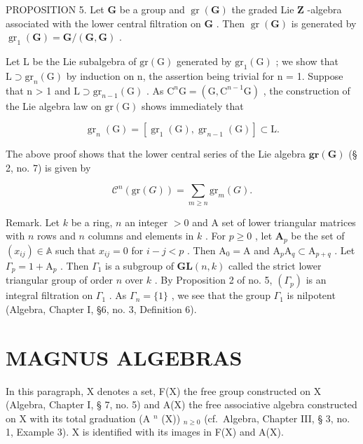 PROPOSITION 5. Let \(\mathbf{G}\) be a group and \(\operatorname{gr}(\mathbf{G})\) the graded Lie \(\mathbf{Z}\) -algebra associated with the lower central filtration on \(\mathbf{G}\) . Then \(\operatorname{gr}(\mathbf{G})\) is generated by \(\operatorname{gr}_1(\mathbf{G}) = \mathbf{G}/(\mathbf{G},\mathbf{G})\) .

Let L be the Lie subalgebra of \(\mathrm{gr}(\mathrm{G})\) generated by \(\mathrm{gr}_{1}(\mathrm{G})\) ; we show that \(\mathrm{L} \supset \mathrm{gr}_{n}(\mathrm{G})\) by induction on n, the assertion being trivial for n = 1. Suppose that n > 1 and \(\mathrm{L} \supset \mathrm{gr}_{n-1}(\mathrm{G})\) . As \(\mathrm{C}^{n}\mathrm{G} = (\mathrm{G}, \mathrm{C}^{n-1}\mathrm{G})\) , the construction of the Lie algebra law on \(\mathrm{gr}(\mathrm{G})\) shows immediately that

\[
\operatorname{gr} _ {n} (\mathrm{G}) = \left[ \operatorname{gr} _ {1} (\mathrm{G}), \operatorname{gr} _ {n - 1} (\mathrm{G}) \right] \subset \mathrm{L}.
\]

The above proof shows that the lower central series of the Lie algebra \(\mathbf{gr}(\mathbf{G})\) (§ 2, no. 7) is given by

\[
\mathcal {C} ^ {n} (\mathrm{gr} (G)) = \sum_ {m \geqslant n} \mathrm{gr} _ {m} (G).\tag{29}
\]

Remark. Let \(k\) be a ring, \(n\) an integer \(>0\) and A set of lower triangular matrices with \(n\) rows and \(n\) columns and elements in \(k\) . For \(p \geqslant 0\) , let \(\mathbf{A}_p\) be the set of \((x_{ij}) \in \mathbb{A}\) such that \(x_{ij} = 0\) for \(i - j < p\) . Then \(\mathrm{A}_0 = \mathrm{A}\) and \(\mathrm{A}_p\mathrm{A}_q \subset \mathrm{A}_{p + q}\) . Let \(\Gamma_p = 1 + \mathrm{A}_p\) . Then \(\Gamma_1\) is a subgroup of \(\mathbf{GL}(n,k)\) called the strict lower triangular group of order \(n\) over \(k\) . By Proposition 2 of no. 5, \((\Gamma_p)\) is an integral filtration on \(\Gamma_1\) . As \(\Gamma_n = \{1\}\) , we see that the group \(\Gamma_1\) is nilpotent (Algebra, Chapter I, §6, no. 3, Definition 6).

\section{MAGNUS ALGEBRAS}

In this paragraph, X denotes a set, F(X) the free group constructed on X (Algebra, Chapter I, § 7, no. 5) and A(X) the free associative algebra constructed on X with its total graduation (A \(^{n}\) (X)) \(_{n\geqslant0}\) (cf.~Algebra, Chapter III, § 3, no. 1, Example 3). X is identified with its images in F(X) and A(X).

